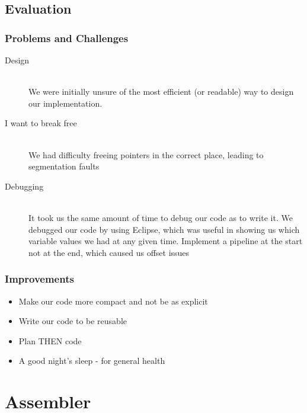 \documentclass{beamer}
\begin{document}
\subsection{Evaluation}


\begin{frame}
\frametitle{Problems and Challenges}

\begin{description}
\item[Design]\hfill\\
	We were initially unsure of the most efficient (or readable) way to design our implementation.
	
\item[I want to break free]\hfill\\
	We had difficulty freeing pointers in the correct place, leading to segmentation faults
\item[Debugging]\hfill\\
    It took us the same amount of time to debug our code as to write it. We debugged our code by using Eclipse, which was useful in showing us which variable values we had at any given time. Implement a pipeline at the start not at the end, which caused us offset issues   


\end{description}


\end{frame}


\begin{frame}
\frametitle{Improvements}
\begin{itemize}
\item Make our code more compact and not be as explicit
\item Write our code to be reusable 
\item Plan THEN code
\item A good night's sleep - for general health

\end{itemize}

\end{frame}


\section{Assembler}
\end{document}
